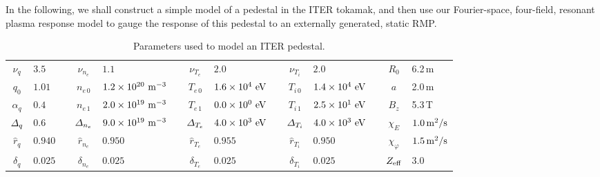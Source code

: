\documentclass[12pt,prb,aps]{revtex4-1}
\begin{document}
In the following, we shall construct a simple model of a pedestal in the ITER tokamak, and then use our Fourier-space, four-field, resonant plasma 
response model to gauge the response of this  pedestal to an  externally generated, static RMP.

\begin{table}\centering
\begin{tabular}{|cl | cl | cl | cl | cl |}
$\nu_q$              &  $3.5$     & $\nu_{n_e}$               & $1.1$                                               & $\nu_{T_e}$             &  $2.0$                                        & $\nu_{T_i}$             &    $2.0$                                    & $R_0$ & 6.2\,m \\[0.5ex]
$q_0$                 & $1.01$    & $n_{e\,0}$                  & $1.2\times 10^{20}\,\,{\rm m}^{-3}$~~  & $T_{e\,0}$                &  $1.6\times 10^{4}\,\,{\rm eV}$ & $T_{i\,0}$                &  $1.4\times 10^{4}\,\,{\rm eV}$  & $a$ & 2.0\,m\\[0.5ex]
$\alpha_q$         & $0.4$      & $n_{e\,1}$                  & $2.0\times 10^{19}\,\,{\rm m}^{-3}$  & $T_{e\,1}$                &  $0.0\times 10^{0}\,\,{\rm eV}$ & $T_{i\,1}$                &  $2.5\times 10^{1}\,\,{\rm eV}$~~  &$B_z$ & 5.3\,T \\[0.5ex]
${\mit\Delta}_q$ & $0.6$      &  ${\mit\Delta}_{n_e}$  & $9.0\times 10^{19}\,\,{\rm m}^{-3}$  & ${\mit\Delta}_{T_e}$ &  $4.0\times 10^{3}\,\,{\rm eV}$~~ & ${\mit\Delta}_{T_i}$ &  $4.0\times 10^{3}\,\,{\rm eV}$\ & $\chi_E$ & $1.0\,{\rm m^2/s}$\\[0.5ex]
$\hat{r}_q$         & $0.940$~~   & $\hat{r}_{n_e}$           & $0.950$                                            & $\hat{r}_{T_e}$         &  $0.955$                                 & $\hat{r}_{T_i}$         &  $0.950$                                    & $\chi_\varphi$ &$1.5\,{\rm m^2/s}$ \\[0.5ex]
$\delta_q$          & $0.025$  & $\delta_{n_e}$            & $0.025$                                            & $\delta_{T_e}$          &  $0.025$                                   & $\delta_{T_i}$         & $0.025$                                     & $Z_{\rm eff}$ & 3.0 \\[0.5ex]
\end{tabular}
\caption{Parameters used to model an ITER pedestal.}\label{t2}
\end{table}
\end{document}
